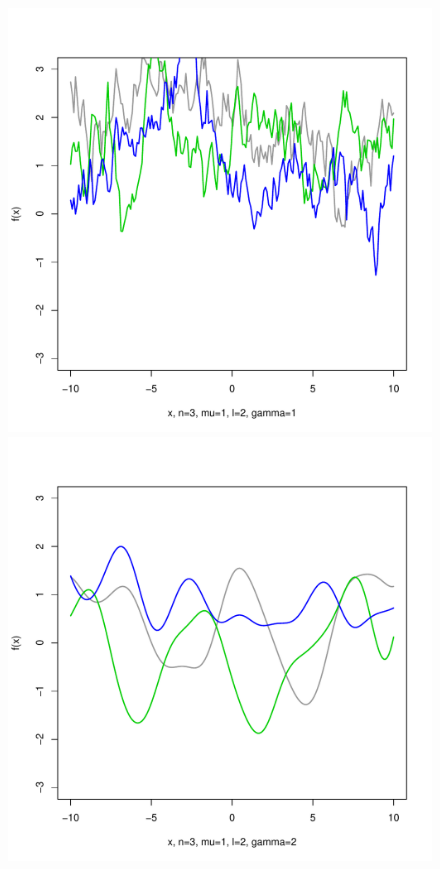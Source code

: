 \documentclass[12pt,letterpaper]{article}
\begin{document}
\begin{figure}
\begin{center}
\includegraphics[scale=0.2]{hw321/n3-m1-l2-g2.pdf}
\includegraphics[scale=0.2]{hw321/n3-m1-l2-g4.pdf}

\end{center}
\end{figure}
\end{document}
